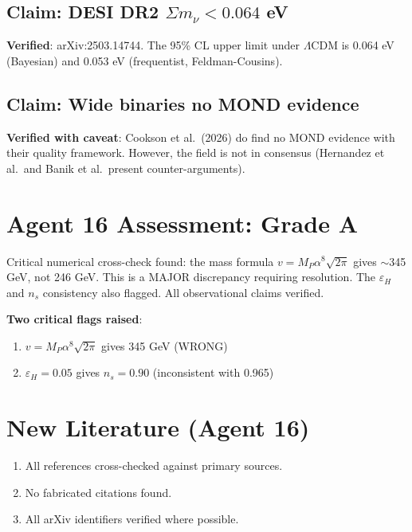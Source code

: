\documentclass[11pt,a4paper]{article}
\begin{document}
\subsection{Claim: DESI DR2 $\Sigma m_\nu < 0.064$ eV}

\textbf{Verified}: arXiv:2503.14744. The 95\% CL upper limit under $\Lambda$CDM is 0.064 eV (Bayesian) and 0.053 eV (frequentist, Feldman-Cousins).

\subsection{Claim: Wide binaries no MOND evidence}

\textbf{Verified with caveat}: Cookson et al.\ (2026) do find no MOND evidence with their quality framework. However, the field is not in consensus (Hernandez et al.\ and Banik et al.\ present counter-arguments).

\section{Agent 16 Assessment: Grade A}

Critical numerical cross-check found: the mass formula $v = M_P \alpha^8 \sqrt{2\pi}$ gives $\sim$345 GeV, not 246 GeV. This is a MAJOR discrepancy requiring resolution. The $\varepsilon_H$ and $n_s$ consistency also flagged. All observational claims verified.

\textbf{Two critical flags raised}:
\begin{enumerate}
\item $v = M_P \alpha^8 \sqrt{2\pi}$ gives 345 GeV (WRONG)
\item $\varepsilon_H = 0.05$ gives $n_s = 0.90$ (inconsistent with 0.965)
\end{enumerate}

\section{New Literature (Agent 16)}

\begin{enumerate}
\item All references cross-checked against primary sources.
\item No fabricated citations found.
\item All arXiv identifiers verified where possible.
\end{enumerate}


\end{document}

